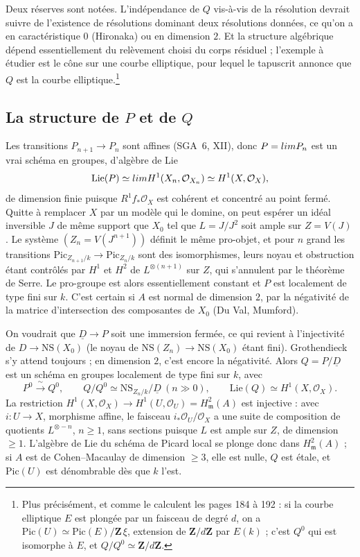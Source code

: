 \documentclass[11pt,a4paper]{article}
\begin{document}
Deux réserves sont notées. L'indépendance de $Q$ vis-à-vis de la résolution
devrait suivre de l'existence de résolutions dominant deux résolutions données,
ce qu'on a en caractéristique $0$ (Hironaka) ou en dimension $2$. Et la
structure algébrique dépend essentiellement du relèvement choisi du corps
résiduel ; l'exemple à étudier est le cône sur une courbe elliptique, pour
lequel le tapuscrit annonce que $Q$ est la courbe elliptique.\footnote{Plus
précisément, et comme le calculent les pages 184 à 192 : si la courbe
elliptique $E$ est plongée par un faisceau de degré $d$, on a
$\mathrm{Pic}(U) \simeq \mathrm{Pic}(E)/\mathbf{Z}\,\xi$, extension de
$\mathbf{Z}/d\mathbf{Z}$ par $E(k)$ ; c'est $Q^0$ qui est isomorphe à $E$, et
$Q/Q^0 \simeq \mathbf{Z}/d\mathbf{Z}$.}

\subsection*{La structure de $P$ et de $Q$}

Les transitions $P_{n+1} \to P_n$ sont affines (SGA~6, XII), donc
$P = \varprojlim P_n$ est un vrai schéma en groupes, d'algèbre de Lie
\[
\mathrm{Lie}(P) \simeq \varprojlim H^1(X_n, \mathcal{O}_{X_n}) \simeq H^1(X, \mathcal{O}_X) ,
\]
de dimension finie puisque $R^1 f_* \mathcal{O}_X$ est cohérent et concentré au
point fermé. Quitte à remplacer $X$ par un modèle qui le domine, on peut
espérer un idéal inversible $J$ de même support que $X_0$ tel que
$L = J/J^2$ soit ample sur $Z = V(J)$. Le système $(Z_n = V(J^{n+1}))$ définit
le même pro-objet, et pour $n$ grand les transitions
$\mathrm{Pic}_{Z_{n+1}/k} \to \mathrm{Pic}_{Z_n/k}$ sont des isomorphismes,
leurs noyau et obstruction étant contrôlés par $H^1$ et $H^2$ de
$L^{\otimes (n+1)}$ sur $Z$, qui s'annulent par le théorème de Serre. Le
pro-groupe est alors essentiellement constant et $P$ est localement de type
fini sur $k$. C'est certain si $A$ est normal de dimension $2$, par la
négativité de la matrice d'intersection des composantes de $X_0$ (Du Val,
Mumford).

On voudrait que $\underline{D} \to P$ soit une immersion fermée, ce qui revient
à l'injectivité de $D \to \mathrm{NS}(X_0)$ (le noyau de
$\mathrm{NS}(Z_n) \to \mathrm{NS}(X_0)$ étant fini). Grothendieck s'y attend
toujours ; en dimension $2$, c'est encore la négativité. Alors
$Q = P/\underline{D}$ est un schéma en groupes localement de type fini sur
$k$, avec
\[
P^0 \xrightarrow{\ \sim\ } Q^0, \qquad
Q/Q^0 \simeq \mathrm{NS}_{Z_n/k}/\underline{D} \ (n \gg 0), \qquad
\mathrm{Lie}(Q) \simeq H^1(X, \mathcal{O}_X) .
\]
La restriction $H^1(X, \mathcal{O}_X) \to H^1(U, \mathcal{O}_U) = H^2_{\mathfrak{m}}(A)$
est injective : avec $i \colon U \to X$, morphisme affine, le faisceau
$i_*\mathcal{O}_U/\mathcal{O}_X$ a une suite de composition de quotients
$L^{\otimes -n}$, $n \geq 1$, sans sections puisque $L$ est ample sur $Z$, de
dimension $\geq 1$. L'algèbre de Lie du schéma de Picard local se plonge donc
dans $H^2_{\mathfrak{m}}(A)$ ; si $A$ est de Cohen--Macaulay de dimension
$\geq 3$, elle est nulle, $Q$ est étale, et $\mathrm{Pic}(U)$ est dénombrable
dès que $k$ l'est.
\end{document}
